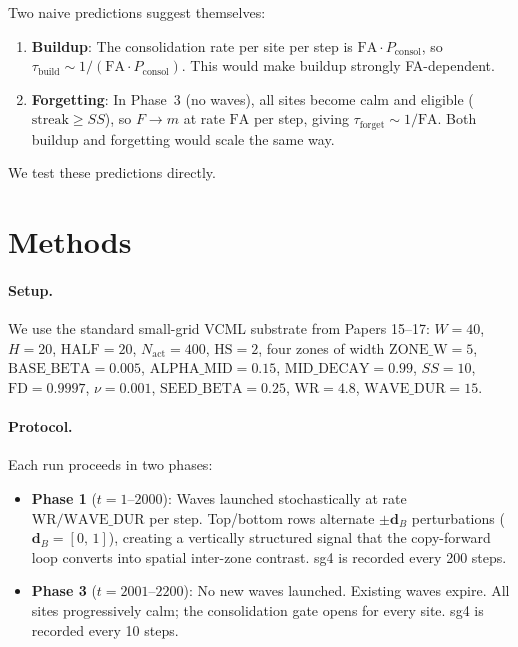 \documentclass[11pt]{article}
\begin{document}
Two naive predictions suggest themselves:
\begin{enumerate}
\item \textbf{Buildup}: The consolidation rate per site per step is $\mathrm{FA} \cdot P_{\mathrm{consol}}$,
  so $\tau_{\mathrm{build}} \sim 1/(\mathrm{FA} \cdot P_{\mathrm{consol}})$.
  This would make buildup strongly FA-dependent.
\item \textbf{Forgetting}: In Phase~3 (no waves), all sites become calm
  and eligible ($\mathrm{streak} \geq SS$), so $F \to m$ at rate $\mathrm{FA}$ per step,
  giving $\tau_{\mathrm{forget}} \sim 1/\mathrm{FA}$.
  Both buildup and forgetting would scale the same way.
\end{enumerate}
We test these predictions directly.

\section{Methods}

\paragraph{Setup.}
We use the standard small-grid VCML substrate from Papers 15--17:
$W=40$, $H=20$, $\mathrm{HALF}=20$, $N_{\mathrm{act}}=400$,
$\mathrm{HS}=2$, four zones of width $\mathrm{ZONE\_W}=5$,
$\mathrm{BASE\_BETA}=0.005$, $\mathrm{ALPHA\_MID}=0.15$,
$\mathrm{MID\_DECAY}=0.99$, $SS=10$, $\mathrm{FD}=0.9997$,
$\nu=0.001$, $\mathrm{SEED\_BETA}=0.25$,
$\mathrm{WR}=4.8$, $\mathrm{WAVE\_DUR}=15$.

\paragraph{Protocol.}
Each run proceeds in two phases:
\begin{itemize}
  \item \textbf{Phase 1} ($t = 1$--$2000$):
    Waves launched stochastically at rate $\mathrm{WR}/\mathrm{WAVE\_DUR}$ per step.
    Top/bottom rows alternate $\pm\mathbf{d}_B$ perturbations
    ($\mathbf{d}_B = [0,\,1]$), creating a vertically structured signal
    that the copy-forward loop converts into spatial inter-zone contrast.
    sg4 is recorded every 200 steps.
  \item \textbf{Phase 3} ($t = 2001$--$2200$):
    No new waves launched. Existing waves expire.
    All sites progressively calm; the consolidation gate opens for every site.
    sg4 is recorded every 10 steps.
\end{itemize}
\end{document}
